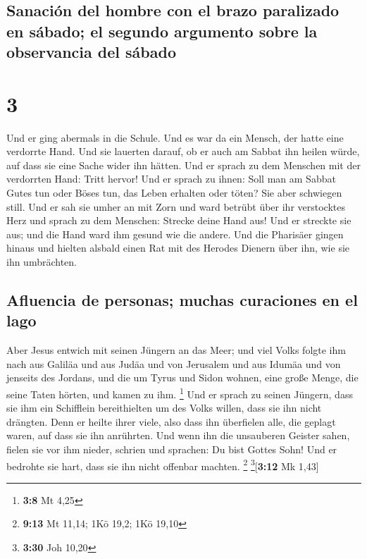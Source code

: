 \hypertarget{sanaciuxf3n-del-hombre-con-el-brazo-paralizado-en-suxe1bado-el-segundo-argumento-sobre-la-observancia-del-suxe1bado}{%
\subsection{Sanación del hombre con el brazo paralizado en sábado; el
segundo argumento sobre la observancia del
sábado}\label{sanaciuxf3n-del-hombre-con-el-brazo-paralizado-en-suxe1bado-el-segundo-argumento-sobre-la-observancia-del-suxe1bado}}

\hypertarget{section-2}{%
\section{3}\label{section-2}}

 Und er ging abermals in die Schule. Und es war da ein
Mensch, der hatte eine verdorrte Hand.  Und sie lauerten
darauf, ob er auch am Sabbat ihn heilen würde, auf dass sie eine Sache
wider ihn hätten.  Und er sprach zu dem Menschen mit der
verdorrten Hand: Tritt hervor!  Und er sprach zu ihnen:
Soll man am Sabbat Gutes tun oder Böses tun, das Leben erhalten oder
töten? Sie aber schwiegen still.  Und er sah sie umher an
mit Zorn und ward betrübt über ihr verstocktes Herz und sprach zu dem
Menschen: Strecke deine Hand aus! Und er streckte sie aus; und die Hand
ward ihm gesund wie die andere.  Und die Pharisäer gingen
hinaus und hielten alsbald einen Rat mit des Herodes Dienern über ihn,
wie sie ihn umbrächten.

\hypertarget{afluencia-de-personas-muchas-curaciones-en-el-lago}{%
\subsection{Afluencia de personas; muchas curaciones en el
lago}\label{afluencia-de-personas-muchas-curaciones-en-el-lago}}

 Aber Jesus entwich mit seinen Jüngern an das Meer; und
viel Volks folgte ihm nach aus Galiläa und aus Judäa  und
von Jerusalem und aus Idumäa und von jenseits des Jordans, und die um
Tyrus und Sidon wohnen, eine große Menge, die seine Taten hörten, und
kamen zu ihm. \footnote{\textbf{3:8} Mt 4,25}  Und er
sprach zu seinen Jüngern, dass sie ihm ein Schifflein bereithielten um
des Volks willen, dass sie ihn nicht drängten.  Denn er
heilte ihrer viele, also dass ihn überfielen alle, die geplagt waren,
auf dass sie ihn anrührten.  Und wenn ihn die unsauberen
Geister sahen, fielen sie vor ihm nieder, schrien und sprachen: Du bist
Gottes Sohn!  Und er bedrohte sie hart, dass sie ihn
nicht offenbar machten. \footnote{\textbf{9:13} Mt 11,14; 1Kö 19,2; 1Kö
  19,10} \footnote{\textbf{3:30} Joh 10,20}{[}\textbf{3:12} Mk 1,43{]}

